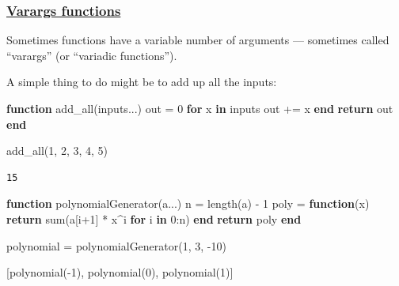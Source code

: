 \documentclass[
]{article}
\newenvironment{Shaded}{\begin{snugshade}}{\end{snugshade}}
\newcommand{\ControlFlowTok}[1]{\textcolor[rgb]{0.00,0.23,0.31}{\textbf{#1}}}
\newcommand{\FloatTok}[1]{\textcolor[rgb]{0.68,0.00,0.00}{#1}}
\newcommand{\FunctionTok}[1]{\textcolor[rgb]{0.28,0.35,0.67}{#1}}
\newcommand{\KeywordTok}[1]{\textcolor[rgb]{0.00,0.23,0.31}{\textbf{#1}}}
\newcommand{\NormalTok}[1]{\textcolor[rgb]{0.00,0.23,0.31}{#1}}
\newcommand{\OperatorTok}[1]{\textcolor[rgb]{0.37,0.37,0.37}{#1}}
\begin{document}
\subsubsection{\texorpdfstring{\href{https://docs.julialang.org/en/v1/manual/functions/\#Varargs-Functions}{Varargs
functions}}{Varargs functions}}\label{varargs-functions}

Sometimes functions have a variable number of arguments --- sometimes
called ``varargs'' (or ``variadic functions'').

A simple thing to do might be to add up all the inputs:

\begin{Shaded}
\begin{Highlighting}[]
\KeywordTok{function} \FunctionTok{add\_all}\NormalTok{(inputs}\OperatorTok{...}\NormalTok{)}
\NormalTok{   out }\OperatorTok{=} \FloatTok{0}
   \ControlFlowTok{for}\NormalTok{ x }\KeywordTok{in}\NormalTok{ inputs}
\NormalTok{   out }\OperatorTok{+=}\NormalTok{ x}
   \ControlFlowTok{end}
   \ControlFlowTok{return}\NormalTok{ out}
\KeywordTok{end}

\FunctionTok{add\_all}\NormalTok{(}\FloatTok{1}\NormalTok{, }\FloatTok{2}\NormalTok{, }\FloatTok{3}\NormalTok{, }\FloatTok{4}\NormalTok{, }\FloatTok{5}\NormalTok{)}
\end{Highlighting}
\end{Shaded}

\begin{verbatim}
15
\end{verbatim}

\begin{Shaded}
\begin{Highlighting}[]
\KeywordTok{function} \FunctionTok{polynomialGenerator}\NormalTok{(a}\OperatorTok{...}\NormalTok{)}
\NormalTok{   n }\OperatorTok{=} \FunctionTok{length}\NormalTok{(a) }\OperatorTok{{-}} \FloatTok{1}
\NormalTok{   poly }\OperatorTok{=} \KeywordTok{function}\NormalTok{(x)}
   \ControlFlowTok{return} \FunctionTok{sum}\NormalTok{(a[i}\OperatorTok{+}\FloatTok{1}\NormalTok{] }\OperatorTok{*}\NormalTok{ x}\OperatorTok{\^{}}\NormalTok{i }\ControlFlowTok{for}\NormalTok{ i }\KeywordTok{in} \FloatTok{0}\OperatorTok{:}\NormalTok{n)}
   \ControlFlowTok{end}
   \ControlFlowTok{return}\NormalTok{ poly}
\KeywordTok{end}

\NormalTok{polynomial }\OperatorTok{=} \FunctionTok{polynomialGenerator}\NormalTok{(}\FloatTok{1}\NormalTok{, }\FloatTok{3}\NormalTok{, }\OperatorTok{{-}}\FloatTok{10}\NormalTok{)}

\NormalTok{[}\FunctionTok{polynomial}\NormalTok{(}\OperatorTok{{-}}\FloatTok{1}\NormalTok{), }\FunctionTok{polynomial}\NormalTok{(}\FloatTok{0}\NormalTok{), }\FunctionTok{polynomial}\NormalTok{(}\FloatTok{1}\NormalTok{)]}
\end{Highlighting}
\end{Shaded}
\end{document}
